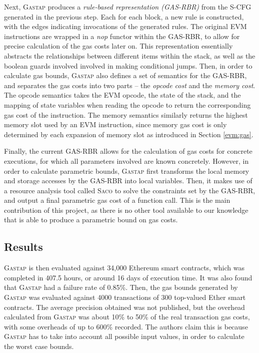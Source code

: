 Next, \textsc{Gastap} produces a \textit{rule-based representation (GAS-RBR)} from the S-CFG generated in the previous step.
Each for each block, a new rule is constructed, with the edges indicating invocations of the generated
rules. The original EVM instructions are wrapped in a \textit{nop} functor within the GAS-RBR, to
allow for precise calculation of the gas costs later on. This representation essentially abstracts
the relationships between different items within the stack, as well as the boolean guards involved
involved in making conditional jumps. Then, in order to calculate gas bounds, \textsc{Gastap} also defines 
a set of semantics for the GAS-RBR, and separates the gas costs into two parts -- the \textit{opcode cost}
and the \textit{memory cost}. The opcode semantics takes the EVM opcode, the state of the stack, and
the mapping of state variables when reading the opcode to return the corresponding gas cost 
of the instruction. The memory semantics similarly returns the highest memory slot used 
by an EVM instruction, since memory gas cost is only determined by each expansion of memory slot
as introduced in Section \ref{evm:gas}.

Finally, the current GAS-RBR allows for the calculation of gas costs for concrete executions,
for which all parameters involved are known concretely. However, in order to calculate parametric
bounds, \textsc{Gastap} first transforms the local memory and storage accesses by the GAS-RBR into local variables.
Then, it makes use of a resource analysis tool called \textsc{Saco} to solve the constraints set by the GAS-RBR,
and output a final parametric gas cost of a function call. This is the main contribution of this project,
as there is no other tool available to our knowledge that is able to produce a parametric bound on gas costs.

\subsection{Results}

\textsc{Gastap} is then evaluated against 34,000 Ethereum smart contracts, which was completed in 407.5 hours, or around 16
days of execution time. It was also found that \textsc{Gastap} had a failure rate of 0.85\%. Then, the gas bounds
generated by \textsc{Gastap} was evaluated against 4000 transactions of 300 top-valued Ether smart contracts.
The average precision obtained was not published, but the overhead calculated from \textsc{Gastap} was about
10\% to 50\% of the real transaction gas costs, with some overheads of up to 600\% recorded. 
The authors claim this is because \textsc{Gastap} has to take into account all possible input values, in order
to calculate the worst case bounds.

